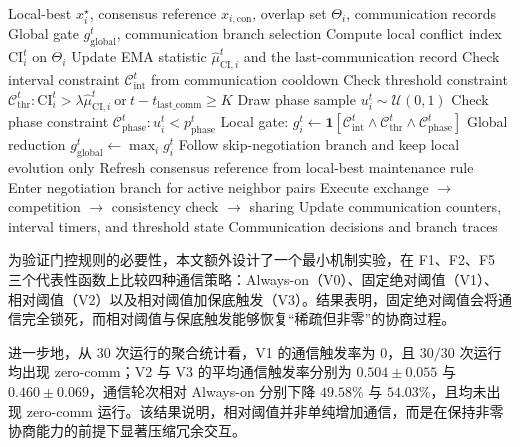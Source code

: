\documentclass[conference]{IEEEtran}
\begin{document}
\begin{algorithm}[t]
  \footnotesize
  \caption{CI-Gated Communication with Phase Sampling (Abstract)}
  \label{alg:ci_gating}
  \begin{algorithmic}[1]
  \Require Local-best $x_i^\star$, consensus reference $x_{i,\mathrm{con}}$, overlap set $\Theta_i$, communication records
  \Ensure Global gate $g_{\mathrm{global}}^t$, communication branch selection
    \State Compute local conflict index $\mathrm{CI}_i^t$ on $\Theta_i$
    \State Update EMA statistic $\hat{\mu}_{\mathrm{CI},i}^t$ and the last-communication record
    \State Check interval constraint $\mathcal{C}_{\mathrm{int}}^t$ from communication cooldown
    \State Check threshold constraint $\mathcal{C}_{\mathrm{thr}}^t: \mathrm{CI}_i^t > \lambda\hat{\mu}_{\mathrm{CI},i}^t\ \text{or}\ t-t_{\mathrm{last\_comm}}\ge K$
    \State Draw phase sample $u_i^t\sim\mathcal{U}(0,1)$
    \State Check phase constraint $\mathcal{C}_{\mathrm{phase}}^t: u_i^t<p_{\mathrm{phase}}^t$
    \State Local gate:
    \Statex \hspace{1.5em}$g_i^t\gets \mathbf{1}\!\left[\mathcal{C}_{\mathrm{int}}^t\land \mathcal{C}_{\mathrm{thr}}^t\land \mathcal{C}_{\mathrm{phase}}^t\right]$
    \State Global reduction $g_{\mathrm{global}}^t\gets \max_i g_i^t$
      \State Follow skip-negotiation branch and keep local evolution only
      \State Refresh consensus reference from local-best maintenance rule
    \Else
      \State Enter negotiation branch for active neighbor pairs
      \State Execute exchange $\rightarrow$ competition $\rightarrow$ consistency check $\rightarrow$ sharing
    \EndIf
    \State Update communication counters, interval timers, and threshold state
  \EndFor
  \State \Return Communication decisions and branch traces
  \end{algorithmic}
  \end{algorithm}


为验证门控规则的必要性，本文额外设计了一个最小机制实验，在 F1、F2、F5 三个代表性函数上比较四种通信策略：Always-on（V0）、固定绝对阈值（V1）、相对阈值（V2）以及相对阈值加保底触发（V3）。结果表明，固定绝对阈值会将通信完全锁死，而相对阈值与保底触发能够恢复“稀疏但非零”的协商过程。

进一步地，从 30 次运行的聚合统计看，V1 的通信触发率为 0，且 $30/30$ 次运行均出现 zero-comm；V2 与 V3 的平均通信触发率分别为 $0.504\pm0.055$ 与 $0.460\pm0.069$，通信轮次相对 Always-on 分别下降 $49.58\%$ 与 $54.03\%$，且均未出现 zero-comm 运行。该结果说明，相对阈值并非单纯增加通信，而是在保持非零协商能力的前提下显著压缩冗余交互。
\end{document}
